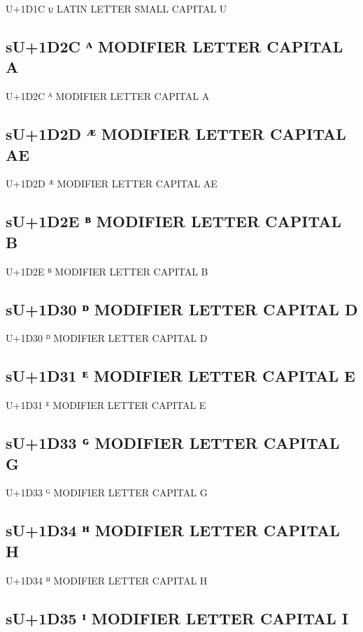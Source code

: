 U+1D1C ᴜ LATIN LETTER SMALL CAPITAL U

\subsection{sU+1D2C ᴬ MODIFIER LETTER CAPITAL A}

U+1D2C ᴬ MODIFIER LETTER CAPITAL A

\subsection{sU+1D2D ᴭ MODIFIER LETTER CAPITAL AE}

U+1D2D ᴭ MODIFIER LETTER CAPITAL AE

\subsection{sU+1D2E ᴮ MODIFIER LETTER CAPITAL B}

U+1D2E ᴮ MODIFIER LETTER CAPITAL B

\subsection{sU+1D30 ᴰ MODIFIER LETTER CAPITAL D}

U+1D30 ᴰ MODIFIER LETTER CAPITAL D

\subsection{sU+1D31 ᴱ MODIFIER LETTER CAPITAL E}

U+1D31 ᴱ MODIFIER LETTER CAPITAL E

\subsection{sU+1D33 ᴳ MODIFIER LETTER CAPITAL G}

U+1D33 ᴳ MODIFIER LETTER CAPITAL G

\subsection{sU+1D34 ᴴ MODIFIER LETTER CAPITAL H}

U+1D34 ᴴ MODIFIER LETTER CAPITAL H

\subsection{sU+1D35 ᴵ MODIFIER LETTER CAPITAL I}

